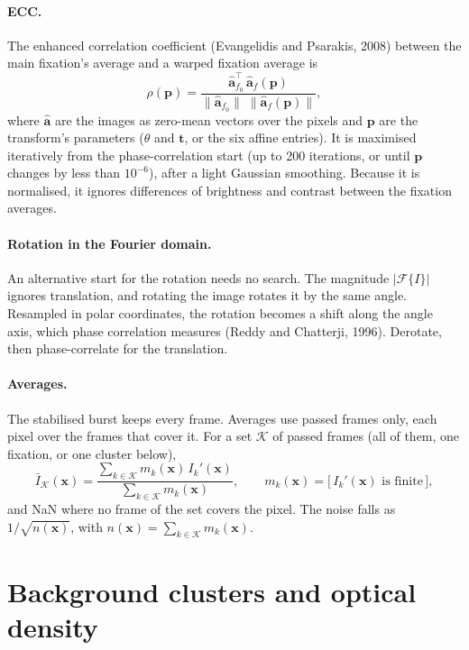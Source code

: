 \documentclass[11pt]{article}
\newcommand{\F}{\mathcal{F}}
\newcommand{\x}{\mathbf{x}}
\begin{document}
\paragraph{ECC.} The enhanced correlation coefficient (Evangelidis and Psarakis, 2008) between the main fixation's
average and a warped fixation average is
\begin{equation}
  \rho(\mathbf p) = \frac{\hat{\mathbf a}_{f_0}^{\top}\, \hat{\mathbf a}_f(\mathbf p)}
                        {\|\hat{\mathbf a}_{f_0}\|\; \|\hat{\mathbf a}_f(\mathbf p)\|},
\end{equation}
where $\hat{\mathbf a}$ are the images as zero-mean vectors over the pixels and $\mathbf p$ are the transform's
parameters ($\theta$ and $\mathbf t$, or the six affine entries). It is maximised iteratively from the
phase-correlation start (up to 200 iterations, or until $\mathbf p$ changes by less than $10^{-6}$), after a light
Gaussian smoothing. Because it is normalised, it ignores differences of brightness and contrast between the
fixation averages.

\paragraph{Rotation in the Fourier domain.} An alternative start for the rotation needs no search. The magnitude
$|\F\{I\}|$ ignores translation, and rotating the image rotates it by the same angle. Resampled in polar
coordinates, the rotation becomes a shift along the angle axis, which phase correlation measures (Reddy and
Chatterji, 1996). Derotate, then phase-correlate for the translation.

\paragraph{Averages.} The stabilised burst keeps every frame. Averages use passed frames only, each pixel over the
frames that cover it. For a set $\mathcal K$ of passed frames (all of them, one fixation, or one cluster below),
\begin{equation}
  \bar I_{\mathcal K}(\x) = \frac{\sum_{k \in \mathcal K} m_k(\x)\, I_k'(\x)}{\sum_{k \in \mathcal K} m_k(\x)},
  \qquad m_k(\x) = \bigl[\, I_k'(\x) \text{ is finite} \,\bigr],
\end{equation}
and NaN where no frame of the set covers the pixel. The noise falls as $1/\sqrt{n(\x)}$, with
$n(\x) = \sum_{k \in \mathcal K} m_k(\x)$.

\section{Background clusters and optical density}\label{sec:od}
\end{document}
